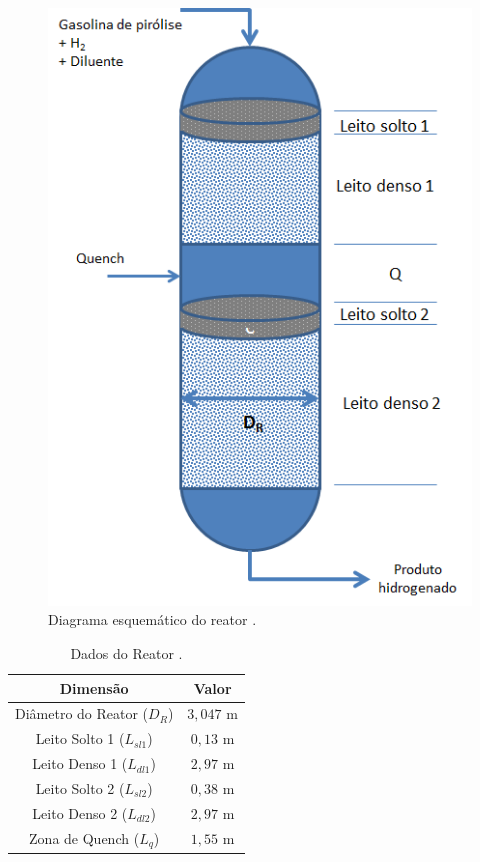 \begin{figure}[htb]
\centering \includegraphics[scale=0.75]{images/Chap3/esquemareator.png}
\caption{Diagrama esquemático do reator \cite{Rojas2014a}.}
\label{fig:esquemareator}
\end{figure}


\begin{table}[!htb]
\begin{center}
\caption{Dados do Reator \cite{Rojas2014a}.}
\label{tab:dadosreator}
\small
\begin{tabular}{cc}
{Dimensão} & {Valor}
\\
\hline
{Diâmetro do Reator ($D_R$)} & $3,047$ m \\
{Leito Solto 1 ($L_{sl1}$)} & $0,13$ m \\
{Leito Denso 1 ($L_{dl1}$)} & $2,97$ m \\
{Leito Solto 2 ($L_{sl2}$)} & $0,38$ m \\
{Leito Denso 2 ($L_{dl2}$)} & $2,97$ m \\
{Zona de Quench ($L_{q}$)} & $1,55$ m \\
\bottomrule
\end{tabular}
\end{center}
\end{table}

